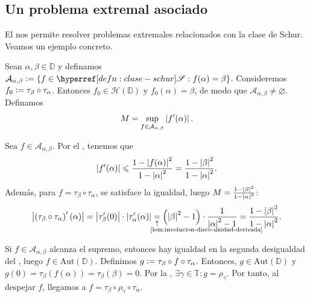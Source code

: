 \subsection{Un problema extremal asociado}

El  nos permite resolver problemas extremales relacionados con la clase de Schur. Veamos un ejemplo concreto.

Sean $\alpha, \beta \in \mathbb{D}$ y definamos $\mathcal{A}_{\alpha, \beta} \defeq \{ f \in \exhyperref[defn:clase-schur]{clase-schur}{\mathscr{S}} : f(\alpha) = \beta \}$. Consideremos $f_0 \vcentcolon= \tau_\beta \circ \tau_\alpha$. Entonces $f_0 \in \mathcal{H}\left(\mathbb{D} \right)$ y $f_0(\alpha) = \beta$, de modo que $\mathcal{A}_{\alpha, \beta} \neq \varnothing$. Definamos
\[
M = \sup_{f \in \mathcal{A}_{\alpha, \beta}} \left|f'(\alpha)\right|.
\]

Sea $f \in \mathcal{A}_{\alpha, \beta}$. Por el , tenemos que
\[
\left|f'(\alpha)\right| \leqslant \frac{1 - \left|f(\alpha)\right|^2}{1 - \left|\alpha\right|^2} = \frac{1 - \left|\beta\right|^2}{1 - \left|\alpha\right|^2}.
\]
Además, para $f = \tau_\beta \circ \tau_{\alpha}$, se satisface la igualdad, luego $M = \frac{1 - \left|\beta\right|^2}{1 - \left|\alpha\right|^2}$:
\[
\abs{\left(\tau_\beta \circ \tau_{\alpha}\right)'(\alpha)} = \abs{\tau_\beta'(0)} \cdot \abs{\tau_{\alpha}'(\alpha)} \dwexpl{=}{\exref[lem:involucion-disco-unidad-derivada]{lem-involucion-disco-unidad-derivada}} \left(\abs{\beta}^2 - 1\right) \cdot \frac{1}{\abs{\alpha}^2 - 1} = \frac{1 - \abs{\beta}^2}{1 - \abs{\alpha}^2}.
\]

Si $f \in \mathcal{A}_{\alpha, \beta}$ alcanza el supremo, entonces hay igualdad en la segunda desigualdad del , luego $f \in \mathrm{Aut} \left(\mathbb{D} \right)$. Definimos $g \vcentcolon= \tau_\beta \circ f \circ \tau_\alpha$. Entonces, $g \in \mathrm{Aut} \left(\mathbb{D} \right)$ y $g(0) = \tau_{\beta} \left(f(\alpha)\right) = \tau_\beta(\beta) = 0$. Por la , $\exists \gamma \in \mathbb{T} : g = \rho_\gamma$. Por tanto, al despejar $f$, llegamos a $f = \tau_\beta \circ \rho_\gamma \circ \tau_\alpha$.




